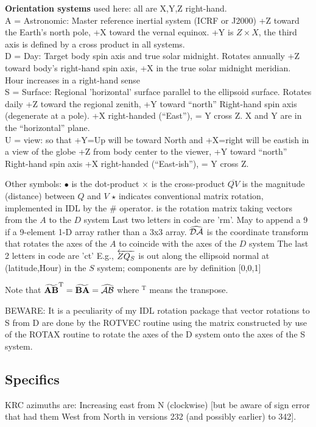\documentclass{article}
\begin{document}
\vspace{2.mm}
\textbf{Orientation systems} used here: all are X,Y,Z right-hand. 
\\ A = Astronomic: Master reference inertial system (ICRF or J2000) 
\qi  +Z toward the Earth's north pole, +X toward the vernal equinox.
\qii +Y is $Z \times  X $, the third axis is defined by a cross product in all systems. 
\\ D = Day: Target body spin axis and true solar midnight. Rotates annually
\qi +Z toward body's right-hand spin axis, +X in the true solar midnight meridian.
\qii Hour increases in a right-hand sense
\\ S = Surface: Regional 'horizontal' surface parallel to the ellipsoid surface. Rotates daily
\qi  +Z toward the regional zenith, +Y toward ``north'' Right-hand spin axis (degenerate at a pole).
\qii  +X right-handed (``East''), = Y cross Z. X and Y are in the ``horizontal'' plane.
\\ U = view: so that +Y=Up will be toward North and  +X=right will be eastish in a view of the globe
\qi +Z from body center to the viewer, +Y toward ``north'' Right-hand spin axis
\qi +X right-handed (``East-ish''), = Y cross Z.

\vspace{2.mm}
Other symbols:
\qi $\bullet$ is the dot-product 
\qi $\times$ is the cross-product 
\qi $\overline{QV}$ is the magnitude (distance) between $Q$ and $V$
\qi $\star$ indicates conventional matrix rotation, implemented in IDL by the \#
 operator.
\qi {} is the rotation matrix taking vectors from the $A$ to the $D$ system
\qii Last two letters in code are 'rm'. May to append a 9 if a 9-element 1-D array rather than a 3x3 array.
\qi  $\widehat {\mathcal{DA}}$ is the coordinate transform that rotates the axes of the $A$ to 
coincide with the axes of the $D$ system
\qii  The last 2 letters in code are 'ct'
\qi E.g., $\overleftarrow{ZQ_S}$ is out along the ellipsoid normal at (latitude,Hour) in the $S$ system;  components are by definition [0,0,1] 


Note that $\widetilde {\mathbf{ AB }}^\mathrm{T} = \widetilde {\mathbf{ BA }}  = \widehat {\mathcal{AB}} $
where $^\mathrm{T}$ means the transpose.

BEWARE: It is a peculiarity of my IDL rotation package that vector rotations to
S from D are done by the ROTVEC routine using the  matrix constructed by
use of the ROTAX routine to rotate the axes of the D system onto the axes of the
S system.


\subsection{Specifics  }
KRC azimuths are: Increasing east from N (clockwise) [but be aware of sign
  error that had them West from North in versions 232 (and possibly earlier) to
  342].
\end{document}
